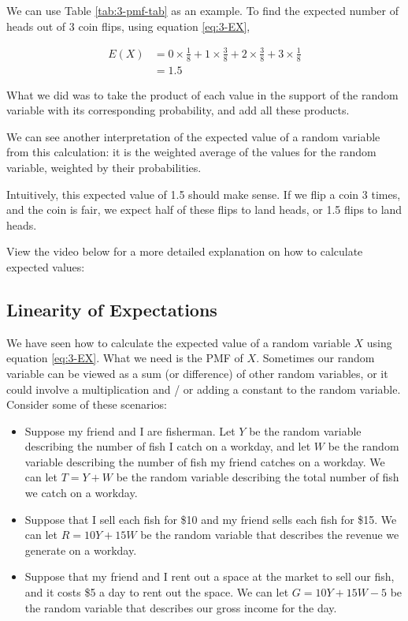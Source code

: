 \documentclass[
]{book}
\begin{document}
We can use Table \ref{tab:3-pmf-tab} as an example. To find the expected number of heads out of 3 coin flips, using equation \eqref{eq:3-EX},

\[
\begin{split}
E(X) &= 0 \times \frac{1}{8} + 1 \times \frac{3}{8} + 2 \times \frac{3}{8} + 3 \times \frac{1}{8}\\
       &= 1.5
\end{split}
\]

What we did was to take the product of each value in the support of the random variable with its corresponding probability, and add all these products.

We can see another interpretation of the expected value of a random variable from this calculation: it is the weighted average of the values for the random variable, weighted by their probabilities.

Intuitively, this expected value of 1.5 should make sense. If we flip a coin 3 times, and the coin is fair, we expect half of these flips to land heads, or 1.5 flips to land heads.

View the video below for a more detailed explanation on how to calculate expected values:

\subsection{Linearity of Expectations}\label{linearity-of-expectations}

We have seen how to calculate the expected value of a random variable \(X\) using equation \eqref{eq:3-EX}. What we need is the PMF of \(X\). Sometimes our random variable can be viewed as a sum (or difference) of other random variables, or it could involve a multiplication and / or adding a constant to the random variable. Consider some of these scenarios:

\begin{itemize}
\item
  Suppose my friend and I are fisherman. Let \(Y\) be the random variable describing the number of fish I catch on a workday, and let \(W\) be the random variable describing the number of fish my friend catches on a workday. We can let \(T = Y+W\) be the random variable describing the total number of fish we catch on a workday.
\item
  Suppose that I sell each fish for \$10 and my friend sells each fish for \$15. We can let \(R = 10Y + 15W\) be the random variable that describes the revenue we generate on a workday.
\item
  Suppose that my friend and I rent out a space at the market to sell our fish, and it costs \$5 a day to rent out the space. We can let \(G = 10Y + 15W - 5\) be the random variable that describes our gross income for the day.
\end{itemize}
\end{document}
